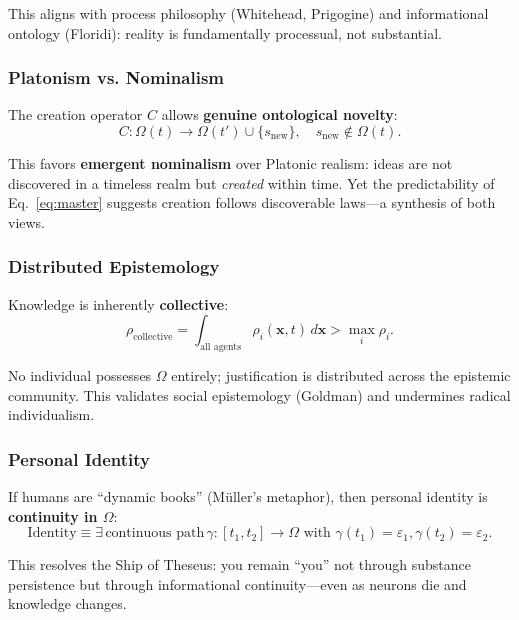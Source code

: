 \documentclass[12pt]{article}
\begin{document}
This aligns with process philosophy (Whitehead, Prigogine\cite{Prigogine1980}) and informational ontology (Floridi\cite{Floridi2011}): reality is fundamentally processual, not substantial.

\subsubsection{Platonism vs. Nominalism}

The creation operator $C$ allows \textbf{genuine ontological novelty}:
\begin{equation}
    C: \Omega(t) \to \Omega(t') \cup \{s_{\text{new}}\}, \quad s_{\text{new}} \notin \Omega(t).
\end{equation}

This favors \textbf{emergent nominalism} over Platonic realism: ideas are not discovered in a timeless realm but \emph{created} within time. Yet the predictability of Eq.~\eqref{eq:master} suggests creation follows discoverable laws---a synthesis of both views.

\subsubsection{Distributed Epistemology}

Knowledge is inherently \textbf{collective}:
\begin{equation}
    \rho_{\text{collective}} = \int_{\text{all agents}} \rho_i(\mathbf{x},t)\, d\mathbf{x} > \max_i \rho_i.
\end{equation}

No individual possesses $\Omega$ entirely; justification is distributed across the epistemic community. This validates social epistemology (Goldman) and undermines radical individualism.

\subsubsection{Personal Identity}

If humans are ``dynamic books'' (Müller's metaphor), then personal identity is \textbf{continuity in $\Omega$}:
\begin{equation}
    \text{Identity} \equiv \exists\, \text{continuous path}\, \gamma:[t_1,t_2] \to \Omega \text{ with } \gamma(t_1)=\varepsilon_1, \gamma(t_2)=\varepsilon_2.
\end{equation}

This resolves the Ship of Theseus: you remain ``you'' not through substance persistence but through informational continuity---even as neurons die and knowledge changes.
\end{document}
